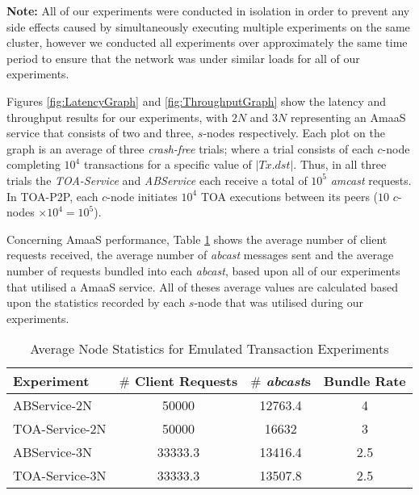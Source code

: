 	\textbf{Note:} All of our experiments were conducted in isolation in order to prevent any side effects caused by simultaneously executing multiple experiments on the same cluster, however we conducted all experiments over approximately the same time period to ensure that the network was under similar loads for all of our experiments. 
	
	Figures \ref{fig:LatencyGraph} and \ref{fig:ThroughputGraph} show the latency and throughput results for our experiments, with $2N$ and $3N$ representing an \textsf{AmaaS} service that consists of two and three, $s$-nodes respectively.  Each plot on the graph is an average of three \emph{crash-free} trials; where a trial consists of each $c$-node completing $10^4$ transactions for a specific value of $|Tx.dst|$. Thus, in all three trials the \emph{TOA-Service} and \emph{ABService} each receive a total of $10^5$ \emph{amcast} requests. In TOA-P2P, each $c$-node initiates $10^4$ TOA executions between its peers ($10$ $c$-nodes $\times 10^4 = 10^5$).  
	
	Concerning \textsf{AmaaS} performance, Table \ref{table:emulated_transaction_averages} shows the average number of client requests received, the average number of \emph{abcast} messages sent and the average number of requests bundled into each \emph{abcast}, based upon all of our experiments that utilised a \textsf{AmaaS} service.  All of theses average values are calculated based upon the statistics recorded by each $s$-node that was utilised during our experiments. 
	
    \begin{table}[h]
  \begin{center}
    \begin{tabular}{|l|c|c|c|}
    \hline
    Experiment & $\#$ Client Requests  & $\#$ \emph{abcast}s & Bundle Rate \\ \hline \hline
    ABService-2N     & 50000    &    12763.4    &    4 \\ \hline
    TOA-Service-2N  & 50000    &   16632    &   3 \\ \hline
    ABService-3N     & 33333.3 &    13416.4  &   2.5 \\ \hline
    TOA-Service-3N  & 33333.3 &    13507.8 & 2.5 \\ \hline
    \end{tabular}
    \caption{Average Node Statistics for Emulated Transaction Experiments}
    \label{table:emulated_transaction_averages}
  \end{center}
\end{table}	
	
